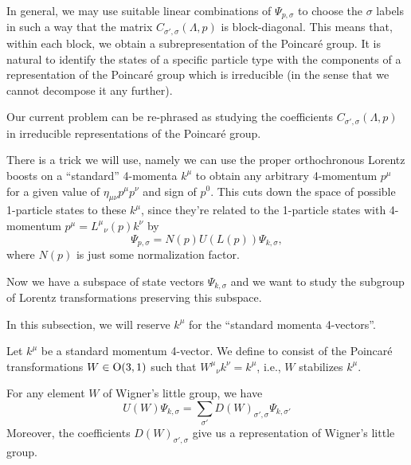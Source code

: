 In general, we may use suitable linear combinations of $\Psi_{p,\sigma}$
to choose the $\sigma$ labels in such a way that the matrix
$C_{\sigma',\sigma}(\Lambda,p)$ is block-diagonal. This means that,
within each block, we obtain a subrepresentation of the Poincar\'e group.
It is natural to identify the states of a specific particle type with
the components of a representation of the Poincar\'e group which is
irreducible (in the sense that we cannot decompose it any further).

\begin{problem}
Our current problem can be re-phrased as studying the coefficients
$C_{\sigma',\sigma}(\Lambda,p)$ in irreducible representations of the
Poincar\'e group.
\end{problem}

There is a trick we will use, namely we can use the proper orthochronous Lorentz
boosts on a ``standard'' 4-momenta $k^{\mu}$ to obtain any arbitrary
4-momentum $p^{\mu}$ for a given value of $\eta_{\mu\nu}p^{\mu}p^{\nu}$
and sign of $p^{0}$. This cuts down the space of possible 1-particle
states to these $k^{\mu}$, since they're related to the 1-particle
states with 4-momentum $p^{\mu} = {L^{\mu}}_{\nu}(p)k^{\nu}$ by
\begin{equation}
\Psi_{p,\sigma} = N(p)U(L(p))\Psi_{k,\sigma},
\end{equation}
where $N(p)$ is just some normalization factor.

Now we have a subspace of state vectors $\Psi_{k,\sigma}$ and we want to
study the subgroup of Lorentz transformations preserving this subspace.

In this subsection, we will reserve $k^{\mu}$ for the ``standard momenta 4-vectors''.

\begin{definition}
Let $k^{\mu}$ be a standard momentum 4-vector. We define
 to consist of the Poincar\'e transformations
$W\in\mathrm{O}(3,1)$ such that ${W^{\mu}}_{\nu}k^{\nu}=k^{\mu}$, i.e., $W$
stabilizes $k^{\mu}$.
\end{definition}

\begin{theorem}
  For any element $W$ of Wigner's little group, we have
  \begin{equation}
U(W)\Psi_{k,\sigma} = \sum_{\sigma'}D(W)_{\sigma',\sigma}\Psi_{k,\sigma'}
  \end{equation}
  Moreover, the coefficients $D(W)_{\sigma',\sigma}$ give us a
  representation of Wigner's little group.
\end{theorem}

